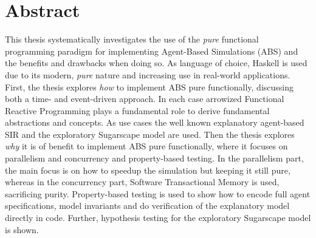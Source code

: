 \section*{Abstract}

%
%
%

This thesis systematically investigates the use of the \textit{pure} functional programming paradigm for implementing Agent-Based Simulations (ABS) and the benefits and drawbacks when doing so. As language of choice, Haskell is used due to its modern, \textit{pure} nature and increasing use in real-world applications. First, the thesis explores \textit{how} to implement ABS pure functionally, discussing both a time- and event-driven approach. In each case arrowized Functional Reactive Programming plays a fundamental role to derive fundamental abstractions and concepts. As use cases the well known explanatory agent-based SIR and the exploratory Sugarscape model are used. Then the thesis explores \textit{why} it is of benefit to implement ABS pure functionally, where it focuses on parallelism and concurrency and property-based testing. In the parallelism part, the main focus is on how to speedup the simulation but keeping it still pure, whereas in the concurrency part, Software Transactional Memory is used, sacrificing purity. Property-based testing is used to show how to encode full agent specifications, model invariants and do verification of the explanatory model directly in code. Further, hypothesis testing for the exploratory Sugarscape model is shown.

